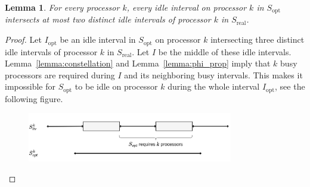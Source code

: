 \documentclass[a4paper]{article}
\DeclareMathOperator{\opt}{opt}
\DeclareMathOperator{\real}{real}
\newtheorem{lemma}[theorem]{Lemma}
\begin{document}
\begin{lemma}\label{lemma:intersection}
  For every processor $k$, every idle interval on processor $k$ in $S_{\opt}$ intersects at most two distinct idle intervals of processor $k$ in $S_{\real}$.
\end{lemma}
\begin{proof}
  Let $I_{\opt}$ be an idle interval in $S_{\opt}$ on processor $k$ intersecting three distinct idle intervals of processor $k$ in $S_{\real}$.
  Let $I$ be the middle of these idle intervals.
  Lemma~\ref{lemma:constellation} and Lemma~\ref{lemma:phi_prop} imply that $k$ busy processors are required during $I$ and its neighboring busy intervals.
  This makes it impossible for $S_{\opt}$ to be idle on processor $k$ during the whole interval $I_{\opt}$, see the following figure.
  \begin{figure}[H]
    \centering
    \includegraphics[width=0.8\textwidth]{graphics/lemma_intersection.jpg}
    \label{fig:lemma_intersection}
  \end{figure}
\end{proof}
\end{document}

